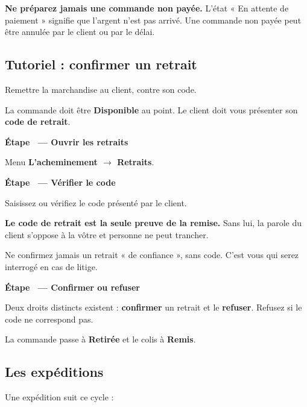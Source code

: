 \documentclass[11pt,a4paper]{report}
\newcounter{etape}[section]
\newcommand{\etape}[1]{%
  \stepcounter{etape}%
  \vspace{9pt}%
  \noindent{\color{garahPrimaire}\rule{3pt}{13pt}}\hspace{6pt}%
  {\bfseries\large Étape \theetape\ --- #1}\par\vspace{4pt}%
}
\begin{document}
\begin{attention}
\textbf{Ne préparez jamais une commande non payée.} L'état « En attente de
paiement » signifie que l'argent n'est pas arrivé. Une commande non payée peut
être annulée par le client ou par le délai.
\end{attention}

\subsection{Tutoriel : confirmer un retrait}

\begin{objectif}
Remettre la marchandise au client, contre son code.
\end{objectif}

\begin{avant}
La commande doit être \textbf{Disponible} au point. Le client doit vous
présenter son \textbf{code de retrait}.
\end{avant}

\etape{Ouvrir les retraits}

Menu \textbf{L'acheminement $\rightarrow$ Retraits}.

\etape{Vérifier le code}

Saisissez ou vérifiez le code présenté par le client.

\begin{attention}
\textbf{Le code de retrait est la seule preuve de la remise.} Sans lui, la
parole du client s'oppose à la vôtre et personne ne peut trancher.

Ne confirmez jamais un retrait « de confiance », sans code. C'est vous qui
serez interrogé en cas de litige.
\end{attention}

\etape{Confirmer ou refuser}

Deux droits distincts existent : \textbf{confirmer} un retrait et le
\textbf{refuser}. Refusez si le code ne correspond pas.

\begin{resultat}
La commande passe à \textbf{Retirée} et le colis à \textbf{Remis}.
\end{resultat}

\subsection{Les expéditions}

Une expédition suit ce cycle :
\end{document}
